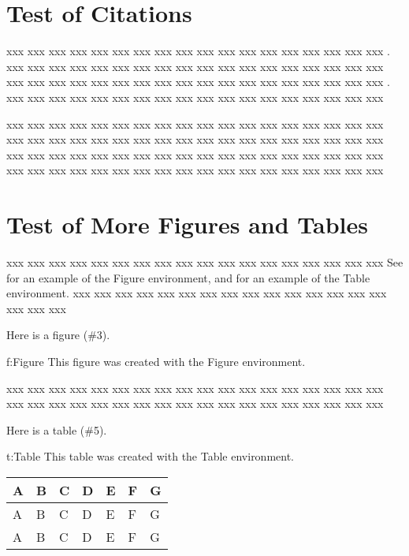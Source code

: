 \documentclass[10pt,twoside%
	]{article}
\begin{document}
\section{Test of Citations}

xxx xxx xxx xxx xxx xxx xxx xxx xxx xxx xxx xxx xxx xxx xxx xxx xxx xxx 
\cite{citepaper}.
xxx xxx xxx xxx xxx xxx xxx xxx xxx xxx xxx xxx xxx xxx xxx xxx xxx xxx 
\cite{citebook}
xxx xxx xxx xxx xxx xxx xxx xxx xxx xxx xxx xxx xxx xxx xxx xxx xxx xxx 
\cite{citeconference}.
xxx xxx xxx xxx xxx xxx xxx xxx xxx xxx xxx xxx xxx xxx xxx xxx xxx xxx 

xxx xxx xxx xxx xxx xxx xxx xxx xxx xxx xxx xxx xxx xxx xxx xxx xxx xxx 
xxx xxx xxx xxx xxx xxx xxx xxx xxx xxx xxx xxx xxx xxx xxx xxx xxx xxx 
xxx xxx xxx xxx xxx xxx xxx xxx xxx xxx xxx xxx xxx xxx xxx xxx xxx xxx 
xxx xxx xxx xxx xxx xxx xxx xxx xxx xxx xxx xxx xxx xxx xxx xxx xxx xxx 



\section{Test of More Figures and Tables}

xxx xxx xxx xxx xxx xxx xxx xxx xxx xxx xxx xxx xxx xxx xxx xxx xxx xxx 
See  for an example of the Figure environment,
and  for an example of the Table environment.
xxx xxx xxx xxx xxx xxx xxx xxx xxx xxx xxx xxx xxx xxx xxx xxx xxx xxx 

Here is a figure (\#3).
\begin{Figure}[hbtbp]{f:Figure}%
	{This figure was created with the Figure environment.}
\fboxrule	0.8mm
\fboxsep	5mm
\end{Figure}

xxx xxx xxx xxx xxx xxx xxx xxx xxx xxx xxx xxx xxx xxx xxx xxx xxx xxx 
xxx xxx xxx xxx xxx xxx xxx xxx xxx xxx xxx xxx xxx xxx xxx xxx xxx xxx 

Here is a table (\#5).
\begin{Table}[hbtbp]{t:Table}%
	{This table was created with the Table environment.}
\setTBstruts
\begin{tabular}{l|l|l|l|l|l|l}
\T\B
A&B&C&D&E&F&G\\
\hline\T\B
A&B&C&D&E&F&G\\
\hline\T\B
A&B&C&D&E&F&G\\
\end{tabular}%
\end{Table}
\end{document}
